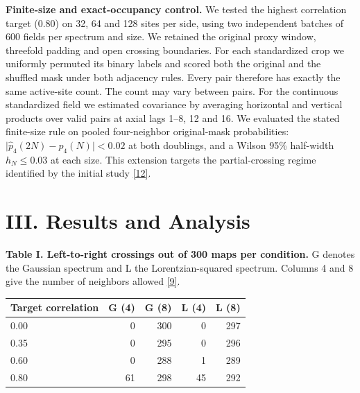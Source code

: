 \documentclass[11pt]{article}
\begin{document}
\textbf{Finite-size and exact-occupancy control.} We tested the highest correlation target (0.80) on 32, 64 and 128 sites per side, using two independent batches of 600 fields per spectrum and size. We retained the original proxy window, threefold padding and open crossing boundaries. For each standardized crop we uniformly permuted its binary labels and scored both the original and the shuffled mask under both adjacency rules. Every pair therefore has exactly the same active-site count. The count may vary between pairs. For the continuous standardized field we estimated covariance by averaging horizontal and vertical products over valid pairs at axial lags 1–8, 12 and 16. We evaluated the stated finite-size rule on pooled four-neighbor original-mask probabilities: $\lvert\widehat p_4(2N)-\widehat p_4(N)\rvert<0.02$ at both doublings, and a Wilson 95\% half-width $h_N\leq0.03$ at each size. This extension targets the partial-crossing regime identified by the initial study \href{https://github.com/tejasvswipe/superconductvity-nickelate-research/blob/17a8b7f801d3c105c6ebfdf49bf1fe5b6fae62b0/finite_size_control.py}{[12]}.

\section*{III. Results and Analysis}

\textbf{Table I. Left-to-right crossings out of 300 maps per condition.} G denotes the Gaussian spectrum and L the Lorentzian-squared spectrum. Columns 4 and 8 give the number of neighbors allowed \href{https://github.com/tejasvswipe/superconductvity-nickelate-research/blob/267535fd908d3e235b5c46d0fefe744221cf16e7/spatial_covariance_sensitivity.csv}{[9]}.

\begin{center}\begin{tabular}{lrrrr}\toprule

Target correlation & G (4) & G (8) & L (4) & L (8) \\\midrule

0.00 & 0 & 300 & 0 & 297 \\

0.35 & 0 & 295 & 0 & 296 \\

0.60 & 0 & 288 & 1 & 289 \\

0.80 & 61 & 298 & 45 & 292 \\

\bottomrule\end{tabular}\end{center}
\end{document}
